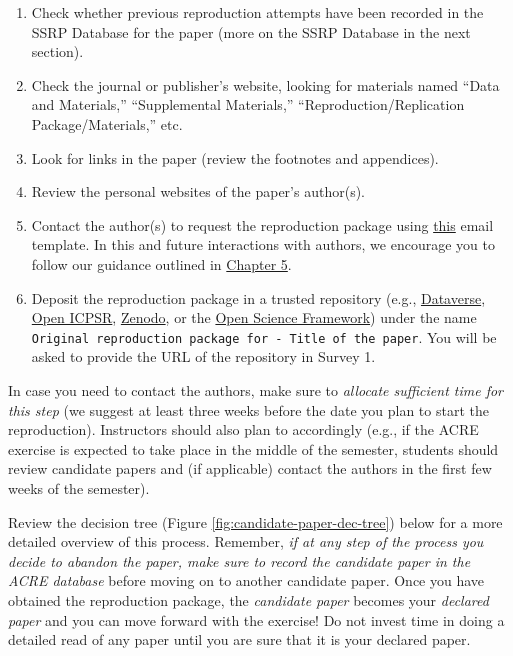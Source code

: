 \documentclass[
]{book}
\providecommand{\tightlist}{%
  \setlength{\itemsep}{0pt}\setlength{\parskip}{0pt}}
\begin{document}
\begin{enumerate}
\def\labelenumi{\arabic{enumi}.}
\tightlist
\item
  Check whether previous reproduction attempts have been recorded in the SSRP Database for the paper (more on the SSRP Database in the next section).
\item
  Check the journal or publisher's website, looking for materials named ``Data and Materials,'' ``Supplemental Materials,'' ``Reproduction/Replication Package/Materials,'' etc.\\
\item
  Look for links in the paper (review the footnotes and appendices).\\
\item
  Review the personal websites of the paper's author(s).
\item
  Contact the author(s) to request the reproduction package using \href{https://bitss.github.io/ACRE/guidance-for-a-constructive-exchange-between-reproducers-and-original-authors.html\#contacting-the-original-authors-when-there-is-no-reproduction-package}{this} email template. In this and future interactions with authors, we encourage you to follow our guidance outlined in \href{https://bitss.github.io/ACRE/guidance-for-a-constructive-exchange-between-reproducers-and-original-authors.html\#contacting-the-original-authors-when-there-is-no-reproduction-package}{Chapter 5}.
\item
  Deposit the reproduction package in a trusted repository (e.g., \href{https://dataverse.org/}{Dataverse}, \href{https://www.openicpsr.org/openicpsr/}{Open ICPSR}, \href{https://zenodo.org/}{Zenodo}, or the \href{https://osf.io/}{Open Science Framework}) under the name \texttt{Original\ reproduction\ package\ for\ -\ Title\ of\ the\ paper}. You will be asked to provide the URL of the repository in Survey 1.
\end{enumerate}

In case you need to contact the authors, make sure to \emph{allocate sufficient time for this step} (we suggest at least three weeks before the date you plan to start the reproduction). Instructors should also plan to accordingly (e.g., if the ACRE exercise is expected to take place in the middle of the semester, students should review candidate papers and (if applicable) contact the authors in the first few weeks of the semester).

Review the decision tree (Figure \ref{fig:candidate-paper-dec-tree}) below for a more detailed overview of this process. Remember, \emph{if at any step of the process you decide to abandon the paper, make sure to record the candidate paper in the ACRE database} before moving on to another candidate paper. Once you have obtained the reproduction package, the \emph{candidate paper} becomes your \emph{declared paper} and you can move forward with the exercise! Do not invest time in doing a detailed read of any paper until you are sure that it is your declared paper.
\end{document}
